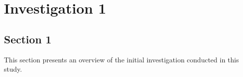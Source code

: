 \chapter{Investigation 1}
\label{chapter3}

\section{Section 1}
\begin{paragraph}
This section presents an overview of the initial investigation conducted in this study.
\end{paragraph}
